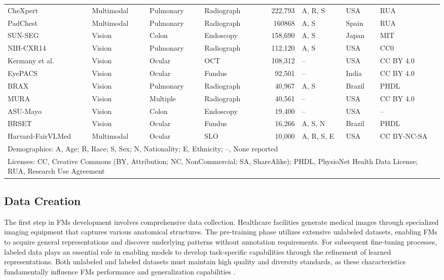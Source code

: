 \begin{table*}[t]
\begin{tabular}{l l l l r l l l}
CheXpert\cite{irvin_chexpert_2019} & Multimodal & Pulmonary & Radiograph & 222,793 & A, R, S & USA & RUA \\
PadChest\cite{bustos_padchest_2020} & Multimodal & Pulmonary & Radiograph & 160868 & A, S & Spain & RUA \\
SUN-SEG\cite{ji_video_2022} & Vision & Colon & Endoscopy & 158,690 & A, S & Japan & MIT \\
NIH-CXR14\cite{wang_chestx-ray8_2017} & Vision & Pulmonary & Radiograph & 112,120 & A, S & USA & CC0 \\
Kermany et al.\cite{kermany_identifying_2018} & Vision & Ocular & OCT & 108,312 & -- & USA & CC BY 4.0 \\
EyePACS\cite{gulshan_development_2016} & Vision & Ocular & Fundus & 92,501 & -- & India & CC BY 4.0 \\
BRAX\cite{reis_brax_2022} & Vision & Pulmonary & Radiograph & 40,967 & A, S & Brazil & PHDL \\
MURA\cite{rajpurkar_mura_2018} & Vision & Multiple & Radiograph & 40,561 & -- & USA & CC BY 4.0 \\
ASU-Mayo\cite{tajbakhsh_automated_2016} & Vision & Colon & Endoscopy & 19,400 & -- & USA & -- \\
BRSET\cite{nakayama_brset_2024} & Vision & Ocular & Fundus & 16,266 & A, S, N & Brazil & PHDL \\
Harvard-FairVLMed\cite{luo_fairclip_2024} & Multimodal & Ocular & SLO & 10,000 & A, R, S, E & USA & CC BY-NC-SA \\
\bottomrule
\multicolumn{8}{p{16cm}}{\footnotesize Demographics: A, Age; R, Race; S, Sex; N, Nationality; E, Ethnicity; --, None reported} \\
\multicolumn{8}{p{16cm}}{\footnotesize Licenses: CC, Creative Commons (BY, Attribution; NC, NonCommercial; SA, ShareAlike); PHDL, PhysioNet Health Data License; RUA, Research Use Agreement} \\
\end{tabular}
\end{table*}

\subsection{Data Creation}
The first step in FMs development involves comprehensive data collection. Healthcare facilities generate medical images through specialized imaging equipment that captures various anatomical structures. The pre-training phase utilizes extensive unlabeled datasets, enabling FMs to acquire general representations and discover underlying patterns without annotation requirements. For subsequent fine-tuning processes, labeled data plays an essential role in enabling models to develop task-specific capabilities through the refinement of learned representations. Both unlabeled and labeled datasets must maintain high quality and diversity standards, as these characteristics fundamentally influence FMs performance and generalization capabilities \cite{deitke_molmo_2024, oquab_dinov2_2024}.

